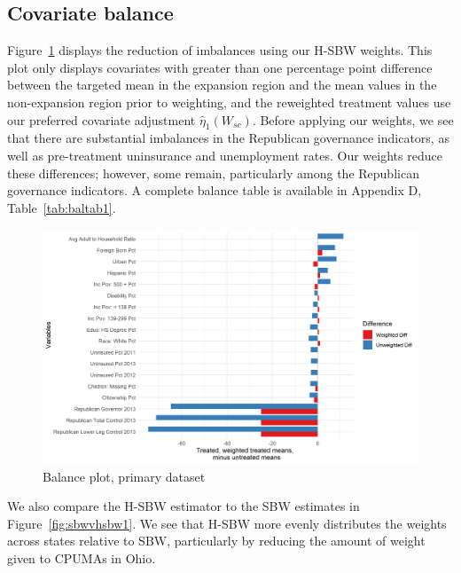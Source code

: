 \subsection{Covariate balance}

Figure~\ref{fig:loveplotc1} displays the reduction of imbalances using our H-SBW weights. This plot only displays covariates with greater than one percentage point difference between the targeted mean in the expansion region and the mean values in the non-expansion region prior to weighting, and the reweighted treatment values use our preferred covariate adjustment $\hat{\eta}_1(W_{sc})$. Before applying our weights, we see that there are substantial imbalances in the Republican governance indicators, as well as pre-treatment uninsurance and unemployment rates. Our weights reduce these differences; however, some remain, particularly among the Republican governance indicators. A complete balance table is available in Appendix D, Table~\ref{tab:baltab1}. 

\begin{figure}[H]
\begin{center}
    \caption{Balance plot, primary dataset}
    \label{fig:loveplotc1}
    \includegraphics[scale=0.6]{01_Plots/balance-plot-etuc1.png}
\end{center}
\end{figure}

We also compare the H-SBW estimator to the SBW estimates in Figure~\ref{fig:sbwvhsbw1}. We see that H-SBW more evenly distributes the weights across states relative to SBW, particularly by reducing the amount of weight given to CPUMAs in Ohio. 

